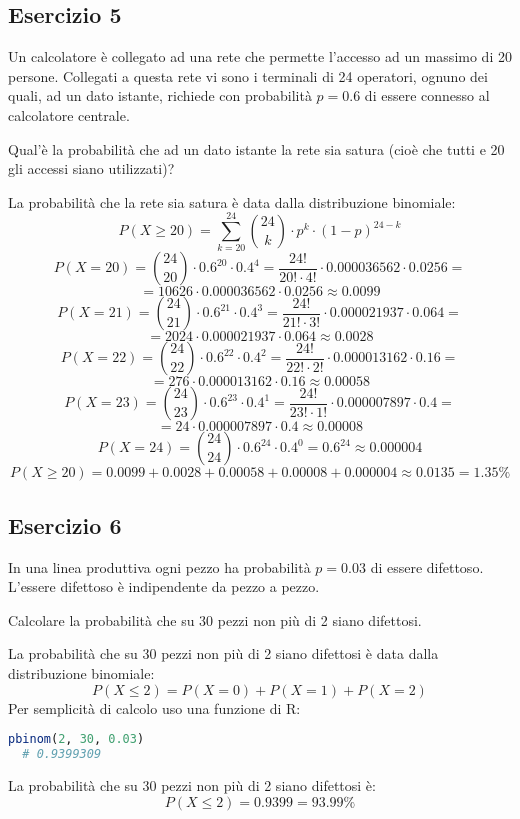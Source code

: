 \documentclass[a4paper]{article}
\theoremstyle{break}
\theoremstyle{break}
\theoremstyle{break}
\theoremstyle{break}
\begin{document}
\subsection{Esercizio 5}
Un calcolatore è collegato ad una rete che permette l'accesso ad un massimo di 20 persone.
Collegati a questa rete vi sono i terminali di 24 operatori, ognuno dei quali, ad un dato
istante, richiede con probabilità \( p = 0.6 \) di essere connesso al calcolatore centrale.

\noindent Qual'è la probabilità che ad un dato istante la rete sia satura (cioè che tutti
e 20 gli accessi siano utilizzati)?

\vspace{1em}
\noindent La probabilità che la rete sia satura è data dalla distribuzione binomiale:
\[
  P(X \ge 20) = \sum_{k=20}^{24} \binom{24}{k} \cdot p^k \cdot (1-p)^{24-k}
\] 
\[
	P(X = 20) = \binom{24}{20} \cdot 0.6^{20} \cdot 0.4^4 = \frac{24!}{20! \cdot 4!} \cdot
	0.000036562 \cdot 0.0256 =
\]
\[
	= 10626 \cdot 0.000036562 \cdot 0.0256 \approx 0.0099
\]
\[
  P(X = 21) = \binom{24}{21} \cdot 0.6^{21} \cdot 0.4^3 = \frac{24!}{21! \cdot 3!} \cdot
  0.000021937 \cdot 0.064 =
\] 
\[
  = 2024 \cdot 0.000021937 \cdot 0.064 \approx 0.0028
\] 
\[
  P(X = 22) = \binom{24}{22} \cdot 0.6^{22} \cdot 0.4^2 = \frac{24!}{22! \cdot 2!} \cdot
  0.000013162 \cdot 0.16 =
\] 
\[
  = 276 \cdot 0.000013162 \cdot 0.16 \approx 0.00058
\] 
\[
  P(X = 23) = \binom{24}{23} \cdot 0.6^{23} \cdot 0.4^1 = \frac{24!}{23! \cdot 1!} \cdot
  0.000007897 \cdot 0.4 =
\] 
\[
  = 24 \cdot 0.000007897 \cdot 0.4 \approx 0.00008
\] 
\[
  P(X = 24) = \binom{24}{24} \cdot 0.6^{24} \cdot 0.4^0 = 0.6^{24} \approx 0.000004
\] 
\[
  P(X \ge 20) = 0.0099 + 0.0028 + 0.00058 + 0.00008 + 0.000004 \approx 0.0135 = 1.35\%
\] 

\subsection{Esercizio 6}
In una linea produttiva ogni pezzo ha probabilità \( p = 0.03 \) di essere difettoso.
L'essere difettoso è indipendente da pezzo a pezzo.

\noindent Calcolare la probabilità che su 30 pezzi non più di 2 siano difettosi.

\vspace{1em}
\noindent La probabilità che su 30 pezzi non più di 2 siano difettosi è data dalla distribuzione
binomiale:
\[
	P(X \le 2) = P(X = 0) + P(X = 1) + P(X = 2)
\]
Per semplicità di calcolo uso una funzione di R:
\begin{lstlisting}[language=R]
  pbinom(2, 30, 0.03)
  # 0.9399309
\end{lstlisting}
La probabilità che su 30 pezzi non più di 2 siano difettosi è:
\[
	P(X \le 2) = 0.9399 = 93.99\%
\]
\end{document}
